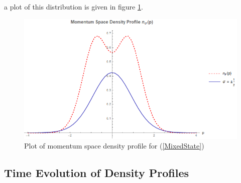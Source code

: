 \documentclass[onecolumn,english,aps,pra]{revtex4}
\begin{document}
a plot of this distribution is given in figure \ref{fig:InitialMomentumProfile}.
\begin{figure}
\includegraphics[scale=0.6]{"../Plots/MomentumSpaceDProfileMixedSpinor"}
\caption{Plot of momentum space density profile for (\ref{MixedState})}
\label{fig:InitialMomentumProfile}
\end{figure}

\subsection{Time Evolution of Density Profiles}
\end{document}

